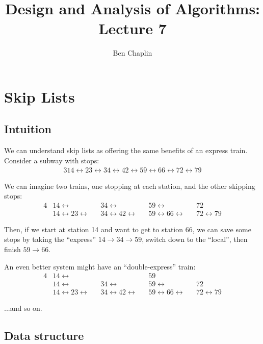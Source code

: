 \documentclass[11pt]{article}
\title{Design and Analysis of Algorithms: Lecture 7}
\author{Ben Chaplin}
\date{}
\theoremstyle{plain}
\theoremstyle{definition}
\begin{document}
\maketitle
\tableofcontents

\section{Skip Lists}
\subsection{Intuition}

We can understand skip lists as offering the same benefits of an express train. Consider a subway
with stops:
\begin{alignat*}{3}
    14 \leftrightarrow 23 \leftrightarrow 34 \leftrightarrow 42 \leftrightarrow 59 \leftrightarrow 66 \leftrightarrow 72 \leftrightarrow 79
\end{alignat*}

We can imagine two trains, one stopping at each station, and the other skipping stops:
\begin{alignat*}{4}
    &14 \leftrightarrow &&34 \leftrightarrow &&59 \leftrightarrow &&72\\
    &14 \leftrightarrow 23 \leftrightarrow &&34 \leftrightarrow 42 \leftrightarrow &&59 \leftrightarrow 66 \leftrightarrow &&72 \leftrightarrow 79
\end{alignat*}

Then, if we start at station 14 and want to get to station 66, we can save some stops by taking the 
``express'' $14 \rightarrow 34 \rightarrow 59$, switch down to the ``local'', then finish $59 \rightarrow 66$.

An even better system might have an ``double-express'' train:
\begin{alignat*}{4}
    &14 \leftrightarrow && &&59\\
    &14 \leftrightarrow &&34 \leftrightarrow &&59 \leftrightarrow &&72\\
    &14 \leftrightarrow 23 \leftrightarrow &&34 \leftrightarrow 42 \leftrightarrow &&59 \leftrightarrow 66 \leftrightarrow &&72 \leftrightarrow 79
\end{alignat*}

...and so on.
 
\subsection{Data structure}
\end{document}
